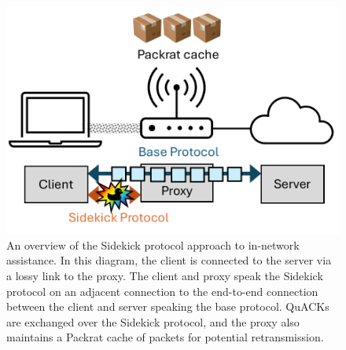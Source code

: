 \begin{figure}[t]
    \centering
    \includegraphics[width=0.7\linewidth]{slides/figures/overview.pdf}
    \caption{An overview of the Sidekick protocol approach to in-network
    assistance. In this diagram, the client is connected to the server
    via a lossy link to the proxy. The client and proxy speak the Sidekick
    protocol on an adjacent connection to the end-to-end connection between
    the client and server speaking the base protocol. QuACKs are exchanged
    over the Sidekick protocol, and the proxy also maintains a Packrat cache
    of packets for potential retransmission.}
    \label{fig:slides:overview}
\end{figure}
